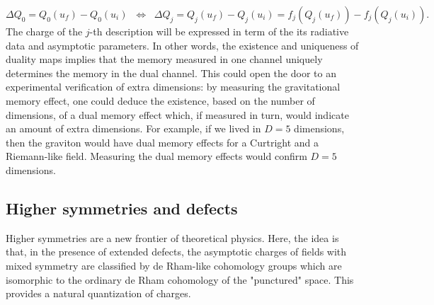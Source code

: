 \documentclass[a4paper,12pt]{article}
\begin{document}
\begin{equation}\label{eq:duality}
\Delta Q_0
= Q_0(u_f)-Q_0(u_i)
\;\;\Longleftrightarrow\;\;
\Delta Q_j
=  Q_j(u_f)-Q_j(u_i)=f_j(Q_j(u_f))-f_j(Q_j(u_i)).
\end{equation}
The charge of the $j$-th description will be expressed in term of the its radiative data and asymptotic parameters. In other words, the existence and uniqueness of duality maps implies that the memory measured in one channel uniquely determines the memory in the dual channel. This could open the door to an experimental verification of extra dimensions: by measuring the gravitational memory effect, one could deduce the existence, based on the number of dimensions, of a dual memory effect which, if measured in turn, would indicate an amount of extra dimensions. For example, if we lived in $D=5$ dimensions, then the graviton would have dual memory effects for a Curtright and a Riemann-like field. Measuring the dual memory effects would confirm $D=5$ dimensions.
\subsection{Higher symmetries and defects}
Higher symmetries \cite{Luo2023,Barkeshli2023,ArmasJain2024,Yuan2023,SchaferNameki2023,AxionMaxwell2024} are a new frontier of theoretical physics. Here, the idea is that, in the presence of extended defects, the asymptotic charges of fields with mixed symmetry are classified by de Rham-like cohomology groups which are isomorphic to the ordinary de Rham cohomology of the "punctured" space. This provides a natural quantization of charges. 
\end{document}
